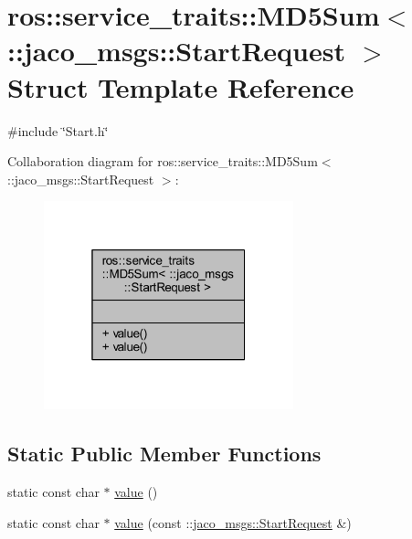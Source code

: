 \hypertarget{structros_1_1service__traits_1_1MD5Sum_3_01_1_1jaco__msgs_1_1StartRequest_01_4}{}\section{ros\+:\+:service\+\_\+traits\+:\+:M\+D5\+Sum$<$ \+:\+:jaco\+\_\+msgs\+:\+:Start\+Request $>$ Struct Template Reference}
\label{structros_1_1service__traits_1_1MD5Sum_3_01_1_1jaco__msgs_1_1StartRequest_01_4}


{\ttfamily \#include \char`\"{}Start.\+h\char`\"{}}



Collaboration diagram for ros\+:\+:service\+\_\+traits\+:\+:M\+D5\+Sum$<$ \+:\+:jaco\+\_\+msgs\+:\+:Start\+Request $>$\+:
\nopagebreak
\begin{figure}[H]
\begin{center}
\leavevmode
\includegraphics[width=205pt]{d1/d5e/structros_1_1service__traits_1_1MD5Sum_3_01_1_1jaco__msgs_1_1StartRequest_01_4__coll__graph}
\end{center}
\end{figure}
\subsection*{Static Public Member Functions}
\begin{DoxyCompactItemize}
\item 
static const char $\ast$ \hyperlink{structros_1_1service__traits_1_1MD5Sum_3_01_1_1jaco__msgs_1_1StartRequest_01_4_aea9b44695dea3652c5b2b07f82331cd5}{value} ()
\item 
static const char $\ast$ \hyperlink{structros_1_1service__traits_1_1MD5Sum_3_01_1_1jaco__msgs_1_1StartRequest_01_4_a46d7fb0537341ab44b83a56a39ff3b60}{value} (const \+::\hyperlink{namespacejaco__msgs_a967d4b8e4c7fe72a2b13622d4ac5b317}{jaco\+\_\+msgs\+::\+Start\+Request} \&)
\end{DoxyCompactItemize}


